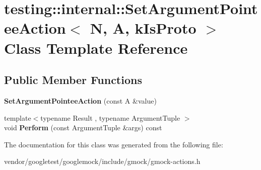 \hypertarget{classtesting_1_1internal_1_1SetArgumentPointeeAction}{}\section{testing\+:\+:internal\+:\+:Set\+Argument\+Pointee\+Action$<$ N, A, k\+Is\+Proto $>$ Class Template Reference}
\label{classtesting_1_1internal_1_1SetArgumentPointeeAction}
\subsection*{Public Member Functions}
\begin{DoxyCompactItemize}
\item 
{\bfseries Set\+Argument\+Pointee\+Action} (const A \&value)\hypertarget{classtesting_1_1internal_1_1SetArgumentPointeeAction_a5a4119ed113667bd4a003ab0bec2cdff}{}\label{classtesting_1_1internal_1_1SetArgumentPointeeAction_a5a4119ed113667bd4a003ab0bec2cdff}

\item 
{\footnotesize template$<$typename Result , typename Argument\+Tuple $>$ }\\void {\bfseries Perform} (const Argument\+Tuple \&args) const \hypertarget{classtesting_1_1internal_1_1SetArgumentPointeeAction_a2bb0bc420cbd3d742853c1a4dab00b15}{}\label{classtesting_1_1internal_1_1SetArgumentPointeeAction_a2bb0bc420cbd3d742853c1a4dab00b15}

\end{DoxyCompactItemize}


The documentation for this class was generated from the following file\+:\begin{DoxyCompactItemize}
\item 
vendor/googletest/googlemock/include/gmock/gmock-\/actions.\+h\end{DoxyCompactItemize}
